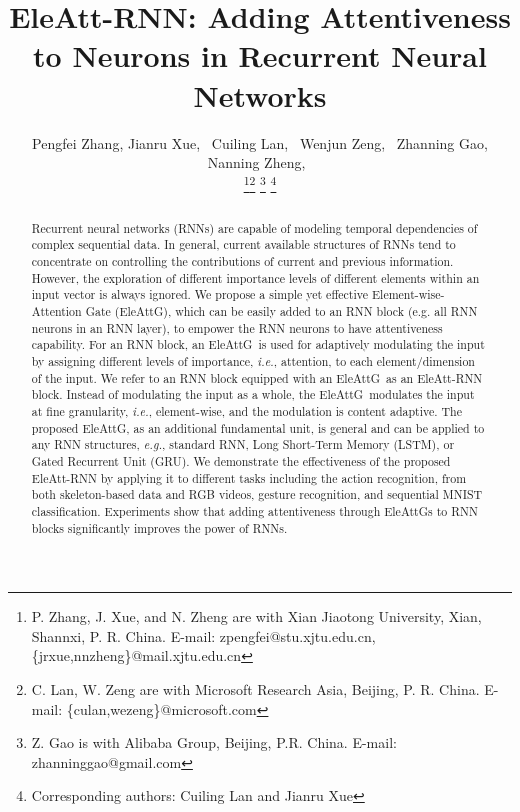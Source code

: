 \documentclass[journal]{IEEEtran}
\newcommand{\EleAttGn}{{EleAttG}}
\newcommand{\EleAttG}{{EleAttG~}}
\begin{document}
	
\title{EleAtt-RNN: Adding Attentiveness to Neurons in Recurrent Neural Networks}


\author{{Pengfei Zhang},
	Jianru Xue,~
	Cuiling Lan,~
	Wenjun Zeng,~
	{Zhanning Gao},
	Nanning Zheng,~
	
\thanks{P. Zhang, J. Xue, and N. Zheng are with Xian Jiaotong University, Xian, Shannxi, P. R. China. E-mail: zpengfei@stu.xjtu.edu.cn, \{jrxue,nnzheng\}@mail.xjtu.edu.cn}\thanks{C. Lan, W. Zeng are with Microsoft Research Asia, Beijing, P. R. China. \protect E-mail: \{culan,wezeng\}@microsoft.com}
\thanks{Z. Gao is with Alibaba Group, Beijing, P.R. China. E-mail: zhanninggao@gmail.com}
\thanks{Corresponding authors: Cuiling Lan and Jianru Xue}}



















\maketitle

\begin{abstract}
Recurrent neural networks (RNNs) are capable of modeling temporal dependencies of complex sequential data. In general, current available structures of RNNs tend to concentrate on controlling the contributions of current and previous information. However, the exploration of different importance levels of different elements within an input vector is always ignored. We propose a simple yet effective Element-wise-Attention Gate (EleAttG), which can be easily added to an RNN block (e.g. all RNN neurons in an RNN layer), to empower the RNN neurons to have attentiveness capability. For an RNN block, an \EleAttG is used for adaptively modulating the input by assigning different levels of importance, {\it i.e.}, attention, to each element/dimension of the input. We refer to an RNN block equipped with an \EleAttG as an EleAtt-RNN block. Instead of modulating the input as a whole, the \EleAttG modulates the input at fine granularity, {\it{i.e.}}, element-wise, and the modulation is content adaptive. The proposed \EleAttGn, as an additional fundamental unit, is general and can be applied to any RNN structures, {\it e.g.}, standard RNN, Long Short-Term Memory (LSTM), or Gated Recurrent Unit (GRU). We demonstrate the effectiveness of the proposed EleAtt-RNN by applying it to different tasks including the action recognition, from both skeleton-based data and RGB videos, gesture recognition, and sequential MNIST classification. Experiments show that adding attentiveness through EleAttGs to RNN blocks significantly improves the power of RNNs.	
\end{abstract}
\end{document}
